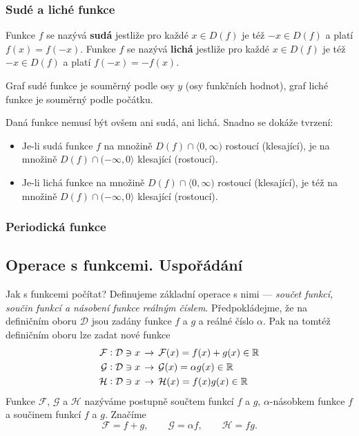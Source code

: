       \subsubsection{Sudé a liché funkce}
        \begin{definition}\label{MA1:def_lim04}
          Funkce $f$ se nazývá \textbf{sudá} jestliže pro každé $x\in D(f)$ je též $-x\in D(f)$  a 
          platí $f(x)=f(-x)$.
          Funkce $f$ se nazývá \textbf{lichá} jestliže pro každé $x\in D(f)$ je též $-x\in D(f)$  a 
          platí $f(-x)=-f(x)$. 
        \end{definition}
        Graf sudé funkce je souměrný podle osy $y$ (osy funkčních hodnot), graf liché funkce je  
        souměrný podle počátku. 
 
         

        Daná funkce nemusí být ovšem ani sudá, ani lichá. Snadno se dokáže tvrzení:
        \begin{itemize}
          \item Je-li sudá funkce $f$ na množině $D(f)\cap\langle0,\infty)$ rostoucí (klesající),
                je na množině $D(f)\cap(-\infty,0\rangle$ klesající (rostoucí).
          \item Je-li lichá funkce na množině $D(f)\cap\langle0,\infty)$ rostoucí (klesající),
                je též na množině $D(f)\cap(-\infty,0\rangle$ klesající (rostoucí).                 
        \end{itemize}
      \subsubsection{Periodická funkce}

    \subsection{Operace s funkcemi. Uspořádání}
      Jak s funkcemi počítat? Definujeme základní operace s nimi — \emph{součet funkcí, součin 
      funkcí a násobení funkce reálným číslem}. Předpokládejme, že na definičním oboru 
      \(\mathcal{D}\) jsou zadány funkce \(f\) a \(g\) a reálné číslo \(\alpha\). Pak na tomtéž 
      definičním oboru lze zadat nové funkce
      \begin{align*}
        \mathcal{F} &: \mathcal{D}\ni x\,\rightarrow\,\mathcal{F}(x) = f(x)+g(x)  \in\mathbb{R}   \\
        \mathcal{G} &: \mathcal{D}\ni x\,\rightarrow\,\mathcal{G}(x) = \alpha g(x)\in\mathbb{R}   \\
        \mathcal{H} &: \mathcal{D}\ni x\,\rightarrow\,\mathcal{H}(x) = f(x) g(x)  \in\mathbb{R} 
      \end{align*}
      Funkce \(\mathcal{F}\), \(\mathcal{G}\) a \(\mathcal{H}\) nazýváme postupně součtem funkcí 
      \(f\) a \(g\), \(\alpha\)-násobkem funkce \(f\) a součinem funkcí \(f\) a \(g\). Značíme
      \begin{equation*}
       \mathcal{F} = f + g, \qquad \mathcal{G} = \alpha f, \qquad \mathcal{H} = fg. 
      \end{equation*}
      
